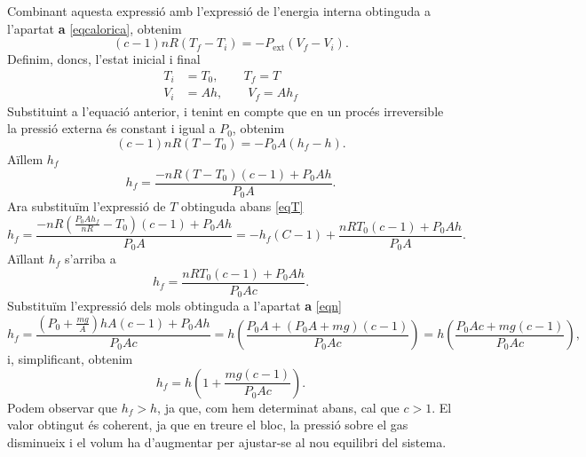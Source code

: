 \documentclass[a4paper, 10pt]{article}
\begin{document}
\begin{enumerate}[leftmargin=0pt,label=\arabic*.,labelsep=0.5em,before=\setlength{\parindent}{0pt}]
	Combinant aquesta expressió amb l'expressió de l’energia interna obtinguda a l’apartat \textbf{a} \eqref{eqcalorica}, obtenim
	\begin{equation}
		(c-1)nR(T_f - T_i) = -P_{\text{ext}}(V_f - V_i).
	\end{equation}
	Definim, doncs, l’estat inicial i final
	\begin{align}
		T_i &= T_0, \qquad T_f = T \\
		V_i &= A h, \qquad V_f = A h_f
	\end{align}
	Substituint a l’equació anterior, i tenint en compte que en un procés irreversible la pressió externa és constant i igual a $P_0$, obtenim
	\begin{equation}
		(c-1)nR(T - T_0) = -P_0 A (h_f - h).
	\end{equation}
	Aïllem $h_f$
	\begin{equation}
		h_f = \frac{-nR(T - T_0)(c-1) + P_0 A h}{P_0 A}.
	\end{equation}
	Ara substituïm l’expressió de $T$ obtinguda abans \eqref{eqT}
	\begin{equation}
		h_f = 
		\frac{
			-nR\left(\frac{P_0 A h_f}{nR} - T_0\right)(c-1) + P_0 A h
		}{P_0 A}
		=
		-h_f(C-1) + 
		\frac{nR T_0(c-1) + P_0 A h}{P_0 A}.
	\end{equation}
	Aïllant $h_f$ s’arriba a
	\begin{equation}
		h_f = \frac{nR T_0 (c-1) + P_0 A h}{P_0 A c}.
	\end{equation}
	Substituïm l’expressió dels mols obtinguda a l’apartat \textbf{a} \eqref{eqn}
	\begin{equation}
		h_f 
		= 
		\frac{(P_0 + \frac{mg}{A})hA(c-1) + P_0 A h}{P_0 A c}
		=
		h \left( \frac{P_0 A + (P_0 A + mg)(c-1)}{P_0 A c} \right)
		=
		h \left( \frac{P_0 A c + mg(c-1)}{P_0 A c} \right),
	\end{equation}
	i, simplificant, obtenim
	\begin{equation}
		\boxed{h_f = h \left( 1 + \frac{mg(c-1)}{P_0 A c} \right)} \label{eqhf}.
	\end{equation}
	Podem observar que $h_f > h$, ja que, com hem determinat abans, cal que $c>1$. El valor obtingut és coherent, ja que en treure el bloc, la pressió sobre el gas disminueix i el volum ha d’augmentar per ajustar-se al nou equilibri del sistema.
	

\end{enumerate}
\end{document}
